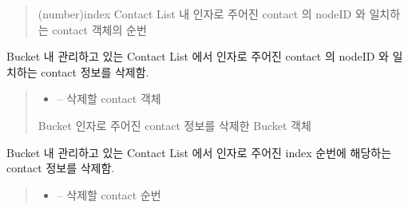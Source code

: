 \documentclass[a4paper,10pt,english]{sphinxmanual}
\begin{document}
\begin{fulllineitems}
\begin{fulllineitems}
\begin{quote}
\begin{description}
\begin{itemize}
\end{itemize}

\sphinxAtStartPar
(number)index \sphinxhyphen{} Contact List 내 인자로 주어진 contact 의 nodeID 와 일치하는 contact 객체의 순번

\end{description}\end{quote}

\end{fulllineitems}


\begin{fulllineitems}
\label{\detokenize{_kademlia:Bucket.remove}}
\pysigstartsignatures
{}
\pysigstopsignatures
\sphinxAtStartPar
Bucket 내 관리하고 있는 Contact List 에서 인자로 주어진 contact 의 nodeID 와 일치하는 contact 정보를 삭제함.
\begin{quote}\begin{description}
\begin{itemize}
\item {} 
\sphinxAtStartPar
{} – 삭제할 contact 객체

\end{itemize}

\sphinxAtStartPar
Bucket \sphinxhyphen{} 인자로 주어진 contact 정보를 삭제한 Bucket 객체

\end{description}\end{quote}

\end{fulllineitems}


\begin{fulllineitems}
\label{\detokenize{_kademlia:Bucket.removeIndex}}
\pysigstartsignatures
{}
\pysigstopsignatures
\sphinxAtStartPar
Bucket 내 관리하고 있는 Contact List 에서 인자로 주어진 index 순번에 해당하는 contact 정보를 삭제함.
\begin{quote}\begin{description}
\begin{itemize}
\item {} 
\sphinxAtStartPar
{} – 삭제할 contact 순번


\end{itemize}
\end{description}
\end{quote}
\end{fulllineitems}
\end{fulllineitems}
\end{document}
